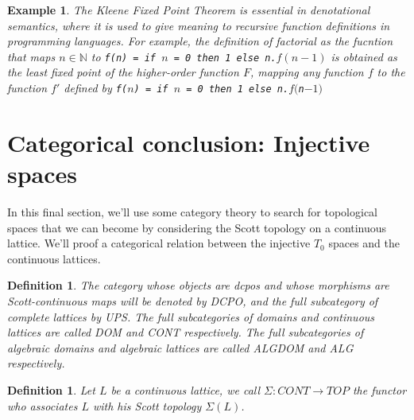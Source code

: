 \documentclass[a4paper,12pt]{article}
\newtheorem{example}[theorem]{Example}
\newtheorem{definition}[theorem]{Definition}
\newcommand{\N}{{\mathbb N}}
\begin{document}
\begin{example}
The Kleene Fixed Point Theorem is essential in denotational semantics, where it is used to give meaning to recursive function definitions in programming languages. For example, the definition of factorial as the fucntion that maps $n \in \N$ to \texttt{f(n) = if $n$ = 0 then 1 else n.$f(n-1)$} is obtained as the least fixed point of the higher-order function $F$, mapping any function $f$ to the function $f'$ defined by \texttt{f($n$) = if $n$ = 0 then 1 else n.$f($n$-1)$}
\end{example}

\section{Categorical conclusion: Injective spaces}
In this final section, we'll use some category theory to search for topological spaces that we can become by considering the Scott topology on a continuous lattice. We'll proof a categorical relation between the injective $T_0$ spaces and the continuous lattices.

\begin{definition}
The category whose objects are dcpos and whose morphisms are Scott-continuous maps will be denoted by \emph{DCPO}, and the full subcategory of complete lattices by \emph{UPS}. The full subcategories of domains and continuous lattices are called \emph{DOM} and \emph{CONT} respectively. The full subcategories of algebraic domains and algebraic lattices are called \emph{ALGDOM} and \emph{ALG} respectively.
\end{definition}

\begin{definition}
Let $L$ be a continuous lattice, we call $\Sigma: CONT \rightarrow TOP$ the functor who associates $L$ with his Scott topology $\Sigma(L)$.
\end{definition}
\end{document}
